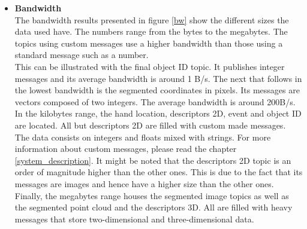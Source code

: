 \begin{itemize}
			\\

			\item{\textbf{Bandwidth}}\\

			The  bandwidth results presented in figure \ref{bw} show the different sizes the data used have. 
			The numbers range from the bytes to the megabytes. 
			The topics using custom messages use a higher bandwidth than those using a standard message such as a number. 
			\\

			This can be illustrated with the final object ID topic. 
			It publishes integer messages and its average bandwidth is around 1 B/s. 
			The next that follows in the lowest bandwidth is the segmented coordinates in pixels. 
			Its messages are vectors composed of two integers. 
			The average bandwidth is around 200B/s. 
			\\

			In the kilobytes range, the hand location, descriptors 2D, event and object ID are located. 
			All but descriptors 2D are filled with custom made messages. 
			The data consists on integers and floats mixed with strings. 
			For more information about custom messages, please read the chapter \ref{system_description}.
			It might be noted that the descriptors 2D topic is an order of magnitude higher than the other ones. 
			This is due to the fact that its messages are images and hence have a higher size than the other ones. 
			\\

			Finally, the megabytes range houses the segmented image topics as well as the segmented point cloud and the descriptors 3D. 
			All are filled with heavy messages that store two-dimensional and three-dimensional data. 
		\end{itemize}